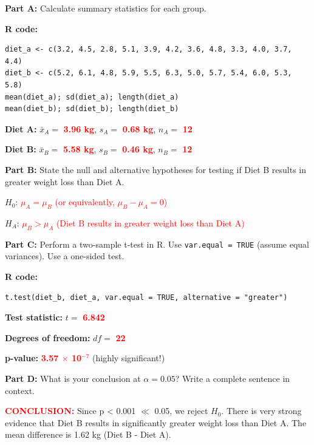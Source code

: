 \documentclass[11pt]{article}
\begin{document}
\vspace{6pt}

\textbf{Part A:} Calculate summary statistics for each group.

\textbf{R code:}
\begin{lstlisting}
diet_a <- c(3.2, 4.5, 2.8, 5.1, 3.9, 4.2, 3.6, 4.8, 3.3, 4.0, 3.7, 4.4)
diet_b <- c(5.2, 6.1, 4.8, 5.9, 5.5, 6.3, 5.0, 5.7, 5.4, 6.0, 5.3, 5.8)
mean(diet_a); sd(diet_a); length(diet_a)
mean(diet_b); sd(diet_b); length(diet_b)
\end{lstlisting}

\textbf{Diet A:} $\bar{x}_A = $ \textcolor{red}{\textbf{3.96 kg}}, $s_A = $ \textcolor{red}{\textbf{0.68 kg}}, $n_A = $ \textcolor{red}{\textbf{12}}

\textbf{Diet B:} $\bar{x}_B = $ \textcolor{red}{\textbf{5.58 kg}}, $s_B = $ \textcolor{red}{\textbf{0.46 kg}}, $n_B = $ \textcolor{red}{\textbf{12}}

\vspace{0.3cm}

\textbf{Part B:} State the null and alternative hypotheses for testing if Diet B results in greater weight loss than Diet A.

$H_0$: \textcolor{red}{$\mu_A = \mu_B$ (or equivalently, $\mu_B - \mu_A = 0$)}

$H_A$: \textcolor{red}{$\mu_B > \mu_A$ (Diet B results in greater weight loss than Diet A)}

\vspace{0.5cm}

\textbf{Part C:} Perform a two-sample t-test in R. Use \texttt{var.equal = TRUE} (assume equal variances). Use a one-sided test.

\textbf{R code:}
\begin{lstlisting}
t.test(diet_b, diet_a, var.equal = TRUE, alternative = "greater")
\end{lstlisting}

\textbf{Test statistic:} $t = $ \textcolor{red}{\textbf{6.842}}

\textbf{Degrees of freedom:} $df = $ \textcolor{red}{\textbf{22}}

\textbf{p-value:} \textcolor{red}{\textbf{3.57 $\times$ 10$^{-7}$}} (highly significant!)

\vspace{0.3cm}

\textbf{Part D:} What is your conclusion at $\alpha = 0.05$? Write a complete sentence in context.

\textcolor{red}{\textbf{CONCLUSION:}} Since p < 0.001 $\ll$ 0.05, we reject $H_0$. There is very strong evidence that Diet B results in significantly greater weight loss than Diet A. The mean difference is 1.62 kg (Diet B - Diet A).
\end{document}
